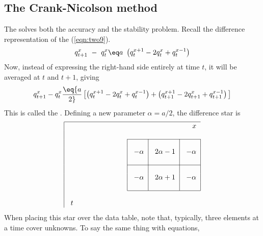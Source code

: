 \subsection{The Crank-Nicolson method}
\par
The  solves both the accuracy and the
stability problem.
Recall the difference representation of the  (\ref{eqn:two9}).
\begin{equation}
q_{{t+1}}^x \ -\ q_t^x  \eq a\  \left( q_t^{{x+1}} - 2
q_t^x + q_t^{{x-1}} \right)
\end{equation}
Now, instead of expressing the right-hand side entirely at time  $t$,
it will be averaged at  $t$  and  $t+1$, giving
\begin{equation}
q_{{t+1}}^x  - q_t^x  \eq  {a \over 2 }\left[
\left( q_t^{{x+1}} - 2q_t^x + q_t^{{x-1}} \right) +
\left( q_{{t+1}}^{{x+1}} - 2q_{{t+1}}^x  + q_{{t+1}}^{{x-1}} \right) \, \right]
\label{eqn:two12a}
\end{equation}
This is called the .
Defining a new parameter
$\alpha = a/2$,
the difference star is 
\begin{equation}
\begin{tabular}{|lccc|c|}  \hline
& &\multicolumn{3}{r}{$x$} \\
&\hspace{.8in} &\multicolumn{3}{c}{ } \\
                                      \cline{3-5}
&   &\multicolumn{1}{|c|}{} & &  \\ 
&   &\multicolumn{1}{|c|}{\ $-\alpha$\ }
&\ $2\alpha -1$\ &\ $-\alpha$\  \\
&   &\multicolumn{1}{|c|}{} & &  \\     \cline{3-5}
&   &\multicolumn{1}{|c|}{} & &  \\
&   &\multicolumn{1}{|c|}{\ $-\alpha$\ }
&\ $2\alpha +1$\ &\ $-\alpha$\  \\  
&   &\multicolumn{1}{|c|}{} & &  \\     \cline{3-5}
&   &\multicolumn{3}{c}{}   \\
\ $t$\ &\multicolumn{4}{c}{} \\
\end{tabular}
\label{eqn:two12b}
\end{equation}
When placing this star over the data table, note that, 
typically, three elements at a time cover unknowns.
To say the same thing with equations,

